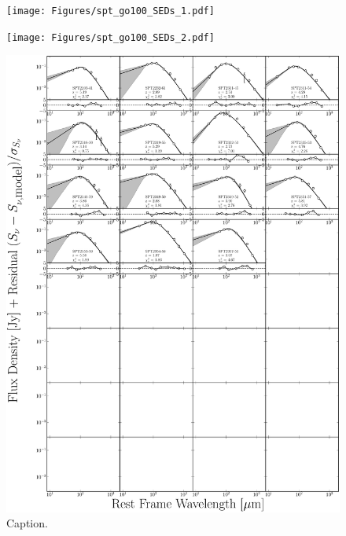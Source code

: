 \begin{figure}
	\centering
	\texttt{[image: Figures/spt\_go100\_SEDs\_1.pdf]}
\end{figure}
\begin{figure}
	\centering
	\texttt{[image: Figures/spt\_go100\_SEDs\_2.pdf]}
\end{figure}
\begin{figure}
	\centering
	\includegraphics[width=\columnwidth]{Figures/spt_go100_SEDs_3.pdf}
	\caption{Caption.}
\end{figure}


